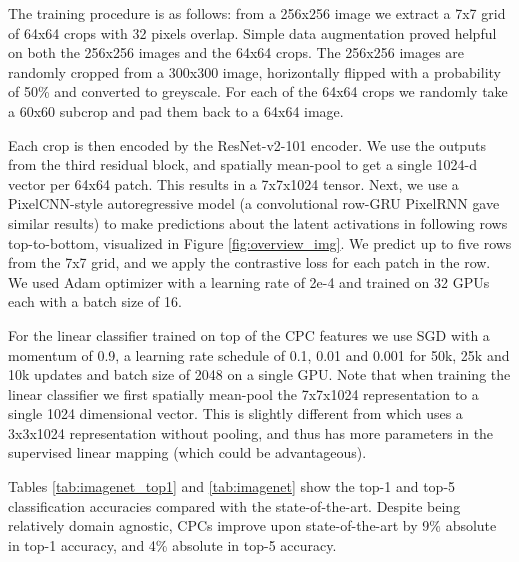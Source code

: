 The training procedure is as follows: from a 256x256 image we extract a 7x7 grid of 64x64 crops with 32 pixels overlap. Simple data augmentation proved helpful on both the 256x256 images and the 64x64 crops. The 256x256 images are randomly cropped from a 300x300 image, horizontally flipped with a probability of 50\% and converted to greyscale. For each of the 64x64 crops we randomly take a 60x60 subcrop and pad them back to a 64x64 image. 

Each crop is then encoded by the ResNet-v2-101 encoder. We use the outputs from the third residual block, and spatially mean-pool to get a single 1024-d vector per 64x64 patch. This results in a 7x7x1024 tensor. Next, we use a PixelCNN-style autoregressive model \cite{aaron2016pixelcnn} (a convolutional row-GRU PixelRNN \cite{aaron2016pixelrnn} gave similar results) to make predictions about the latent activations in following rows top-to-bottom, visualized in Figure \ref{fig:overview_img}. We predict up to five rows from the 7x7 grid, and we apply the contrastive loss for each patch in the row. We used Adam optimizer with a learning rate of 2e-4 and trained on 32 GPUs each with a batch size of 16.

For the linear classifier trained on top of the CPC features we use SGD with a momentum of 0.9, a learning rate schedule of 0.1, 0.01 and 0.001 for 50k, 25k and 10k updates and batch size of 2048 on a single GPU. Note that when training the linear classifier we first spatially mean-pool the 7x7x1024 representation to a single 1024 dimensional vector. This is slightly different from \cite{doersch2017multi} which uses a 3x3x1024 representation without pooling, and thus has more parameters in the supervised linear mapping (which could be advantageous).

Tables \ref{tab:imagenet_top1} and \ref{tab:imagenet} show the top-1 and top-5 classification accuracies compared with the state-of-the-art. Despite being relatively domain agnostic, CPCs improve upon state-of-the-art by 9\% absolute in top-1 accuracy, and 4\% absolute in top-5 accuracy.

